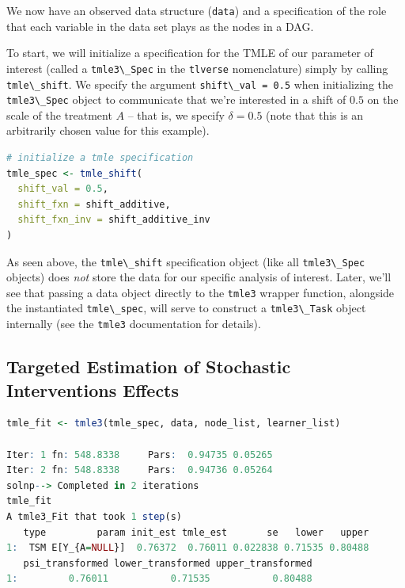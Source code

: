 \documentclass[12pt, krantz2,]{krantz}
\newcommand{\passthrough}[1]{#1}
\theoremstyle{definition}
\theoremstyle{definition}
\theoremstyle{definition}
\newcommand{\1}{\mathbbm{1}}
\begin{document}
We now have an observed data structure (\passthrough{\lstinline!data!}) and a specification of the role
that each variable in the data set plays as the nodes in a DAG.

To start, we will initialize a specification for the TMLE of our parameter of
interest (called a \passthrough{\lstinline!tmle3\_Spec!} in the \passthrough{\lstinline!tlverse!} nomenclature) simply by calling
\passthrough{\lstinline!tmle\_shift!}. We specify the argument \passthrough{\lstinline!shift\_val = 0.5!} when initializing the
\passthrough{\lstinline!tmle3\_Spec!} object to communicate that we're interested in a shift of \(0.5\) on
the scale of the treatment \(A\) -- that is, we specify \(\delta = 0.5\) (note that
this is an arbitrarily chosen value for this example).

\begin{lstlisting}[language=R]
# initialize a tmle specification
tmle_spec <- tmle_shift(
  shift_val = 0.5,
  shift_fxn = shift_additive,
  shift_fxn_inv = shift_additive_inv
)
\end{lstlisting}

As seen above, the \passthrough{\lstinline!tmle\_shift!} specification object (like all \passthrough{\lstinline!tmle3\_Spec!}
objects) does \emph{not} store the data for our specific analysis of interest. Later,
we'll see that passing a data object directly to the \passthrough{\lstinline!tmle3!} wrapper function,
alongside the instantiated \passthrough{\lstinline!tmle\_spec!}, will serve to construct a \passthrough{\lstinline!tmle3\_Task!}
object internally (see the \passthrough{\lstinline!tmle3!} documentation for details).

\hypertarget{targeted-estimation-of-stochastic-interventions-effects}{%
\subsection{Targeted Estimation of Stochastic Interventions Effects}\label{targeted-estimation-of-stochastic-interventions-effects}}

\begin{lstlisting}[language=R]
tmle_fit <- tmle3(tmle_spec, data, node_list, learner_list)

Iter: 1 fn: 548.8338     Pars:  0.94735 0.05265
Iter: 2 fn: 548.8338     Pars:  0.94736 0.05264
solnp--> Completed in 2 iterations
tmle_fit
A tmle3_Fit that took 1 step(s)
   type         param init_est tmle_est       se   lower   upper
1:  TSM E[Y_{A=NULL}]  0.76372  0.76011 0.022838 0.71535 0.80488
   psi_transformed lower_transformed upper_transformed
1:         0.76011           0.71535           0.80488
\end{lstlisting}
\end{document}
